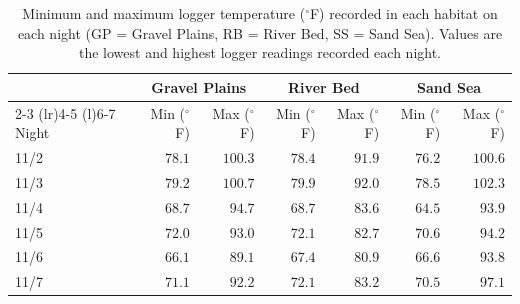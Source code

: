 \begin{table}[H]
\centering
\caption{Minimum and maximum logger temperature ($^{\circ}$F) recorded in each habitat on each night (GP = Gravel Plains, RB = River Bed, SS = Sand Sea). Values are the lowest and highest logger readings recorded each night.}
\label{tab:temp_range}
\begin{tabular}{@{}lrrrrrr@{}}
\toprule
 & \multicolumn{2}{c}{Gravel Plains} & \multicolumn{2}{c}{River Bed} & \multicolumn{2}{c}{Sand Sea} \\
\cmidrule(lr){2-3} \cmidrule(lr){4-5} \cmidrule(l){6-7}
Night & Min ($^{\circ}$F) & Max ($^{\circ}$F) & Min ($^{\circ}$F) & Max ($^{\circ}$F) & Min ($^{\circ}$F) & Max ($^{\circ}$F) \\
\midrule
11/2 & $78.1$ & $100.3$ & $78.4$ & $91.9$ & $76.2$ & $100.6$ \\
11/3 & $79.2$ & $100.7$ & $79.9$ & $92.0$ & $78.5$ & $102.3$ \\
11/4 & $68.7$ & $94.7$ & $68.7$ & $83.6$ & $64.5$ & $93.9$ \\
11/5 & $72.0$ & $93.0$ & $72.1$ & $82.7$ & $70.6$ & $94.2$ \\
11/6 & $66.1$ & $89.1$ & $67.4$ & $80.9$ & $66.6$ & $93.8$ \\
11/7 & $71.1$ & $92.2$ & $72.1$ & $83.2$ & $70.5$ & $97.1$ \\
\bottomrule
\end{tabular}
\end{table}
